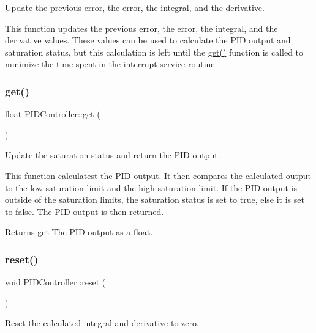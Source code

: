 Update the previous error, the error, the integral, and the derivative. 

This function updates the previous error, the error, the integral, and the derivative values. These values can be used to calculate the P\+ID output and saturation status, but this calculation is left until the \mbox{\hyperlink{class_p_i_d_controller_a9691a50160d89b3aac20fad29293a797}{get()}} function is called to minimize the time spent in the interrupt service routine. \mbox{\label{class_p_i_d_controller_a9691a50160d89b3aac20fad29293a797}} 
\subsubsection{\texorpdfstring{get()}{get()}}
{\footnotesize\ttfamily float P\+I\+D\+Controller\+::get (\begin{DoxyParamCaption}{ }\end{DoxyParamCaption})}



Update the saturation status and return the P\+ID output. 

This function calculatest the P\+ID output. It then compares the calculated output to the low saturation limit and the high saturation limit. If the P\+ID output is outside of the saturation limits, the saturation status is set to true, else it is set to false. The P\+ID output is then returned. \begin{DoxyReturn}{Returns}
get The P\+ID output as a float. 
\end{DoxyReturn}
\mbox{\label{class_p_i_d_controller_ab6adfbffa30414f0a83b95ba999a2fea}} 
\subsubsection{\texorpdfstring{reset()}{reset()}}
{\footnotesize\ttfamily void P\+I\+D\+Controller\+::reset (\begin{DoxyParamCaption}{ }\end{DoxyParamCaption})}



Reset the calculated integral and derivative to zero. 

